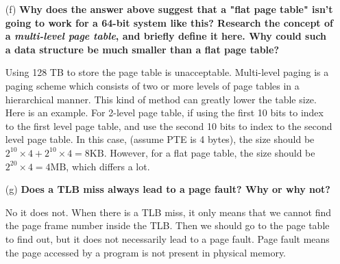 \documentclass{article}
\theoremstyle{remark}
\theoremstyle{definition}
\begin{document}
\begin{enumerate}
        \item[(f)] \textbf{Why does the answer above suggest that a "flat page table" isn't going to work for a 64-bit system like this? Research the concept of a \textit{multi-level page table}, and briefly define it here. Why could such a data structure be much smaller than a flat page table?}

        Using 128 TB to store the page table is unacceptable. Multi-level paging is a paging scheme which consists of two or more levels of page tables in a hierarchical manner. This kind of method can greatly lower the table size. Here is an example. For 2-level page table, if using the first 10 bits to index to the first level page table, and use the second 10 bits to index to the second level page table. In this case, (assume PTE is 4 bytes), the size should be $2^{10}\times 4 + 2^{10}\times 4 = 8\text{KB}$. However, for a flat page table, the size should be $2^{20} \times 4 = 4\text{MB}$, which differs a lot.

        \item[(g)] \textbf{Does a TLB miss always lead to a page fault? Why or why not?}

        No it does not. When there is a TLB miss, it only means that we cannot find the page frame number inside the TLB. Then we should go to the page table to find out, but it does not necessarily lead to a page fault. Page fault means the page accessed by a program is not present in physical memory.

    \end{enumerate}
\end{document}
